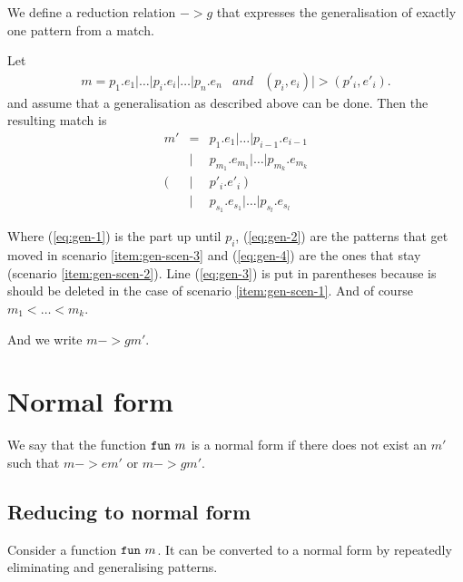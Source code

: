 \begin{definition}[Generalisation, $->g$]
\label{def:gener-match}
  We define a reduction relation $->g$ that expresses the
  generalisation of exactly one pattern from a match.

  Let
  \begin{eqnarray*}[rqTcql]
    m = p_1 \texttt{.} e_1 \texttt{|} \ldots \texttt{|} p_i \texttt{.} e_i
    \texttt{|} \ldots \texttt{|} p_n \texttt{.} e_n & and & (p_i, e_i) |> (p'_i,
    e'_i).
  \end{eqnarray*}
  and assume that a generalisation as described above can be done. Then the
  resulting match is
  \begin{eqnarray}
    m' &=& p_1 \texttt{.} e_1 \texttt{|} \ldots \texttt{|} p_{i-1} \texttt{.}
    e_{i-1} \label{eq:gen-1}\\
    &\texttt{|}& p_{m_1} \texttt{.} e_{m_1} \texttt{|} \ldots \texttt{|} p_{m_k}
    \texttt{.} e_{m_k} \label{eq:gen-2}\\
    (&\texttt{|}& p'_i \texttt{.} e'_i \ ) \label{eq:gen-3}\\
    &\texttt{|}& p_{s_1} \texttt{.} e_{s_1} \texttt{|} \ldots \texttt{|} p_{s_l}
    \texttt{.} e_{s_l} \label{eq:gen-4}
  \end{eqnarray}

  Where (\ref{eq:gen-1}) is the part up until $p_i$, (\ref{eq:gen-2}) are the
  patterns that get moved in scenario \ref{item:gen-scen-3} and (\ref{eq:gen-4})
  are the ones that stay (scenario \ref{item:gen-scen-2}). Line (\ref{eq:gen-3})
  is put in parentheses because is should be deleted in the case of scenario
  \ref{item:gen-scen-1}. And of course $m_1 < \ldots < m_k$.

  And we write $m ->g m'$.
  
\end{definition}

\section{Normal form}
We say that the function $\texttt{fun}\  m$ is a normal form if there does not exist an
$m'$ such that $m ->e m'$ or $m ->g m'$.

\subsection{Reducing to normal form}
Consider a function $\texttt{fun}\  m$. It can be converted to a normal form by repeatedly
eliminating and generalising patterns.

